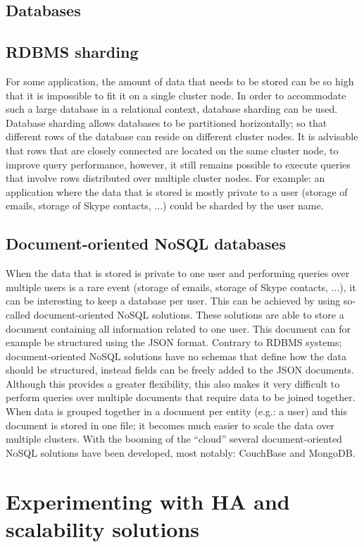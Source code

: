 \documentclass[12pt]{report}
\begin{document}
\section{Databases}
\section{RDBMS sharding}
For some application, the amount of data that needs to be stored can be so high
that it is impossible to fit it on a single cluster node. In order to
accommodate such a large database in a relational context, database
sharding can be used. Database sharding allows databases to be
partitioned horizontally; so that different rows of the database can
reside on different cluster nodes. It is advisable that rows that are
closely connected are located on the same cluster node, to improve
query performance, however, it still remains possible to execute
queries that involve rows distributed over multiple cluster nodes.
For example: an application where the data that is stored is mostly 
private to a user (storage of emails, storage of Skype contacts, ...)
 could be sharded by the user name.
\section{Document-oriented NoSQL databases}
\label{sec:no_sql}
When the data that is stored is private to one user and performing
queries over multiple users is a rare event (storage of emails,
storage of Skype contacts, ...), it can be interesting to keep a
database per user. This can be achieved by using so-called
document-oriented NoSQL solutions. 
These solutions are able to store a document
containing all information related to one user. This document can for
example be structured using the JSON format. Contrary to RDBMS
systems; document-oriented NoSQL solutions have no schemas that define
how the data should be structured, instead fields can be freely added
to the JSON documents.
Although this provides a greater flexibility, this also makes it very
difficult to perform queries over multiple documents that require data
to be joined together.
When data is grouped together in a document per entity (e.g.: a user)
and this document is stored in one file; it becomes much easier to scale the data over
multiple clusters.
With the booming of the ``cloud'' several document-oriented NoSQL
solutions have been developed, most notably: CouchBase and MongoDB.

\chapter{Experimenting with HA and scalability solutions}
\end{document}
